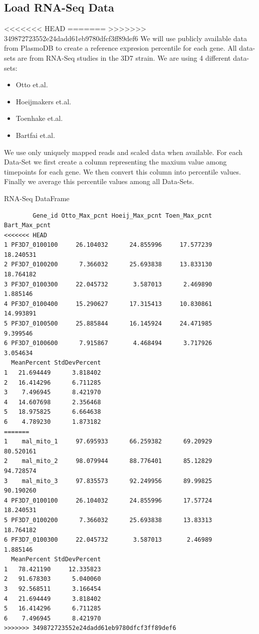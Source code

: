 \documentclass[11pt]{article}
\begin{document}
\subsection{Load RNA-Seq Data}
<<<<<<< HEAD
\label{sec:org3bb7944}
=======
\label{sec:orge943a5f}
>>>>>>> 349872723552e24dadd61eb9780dfcf3ff89def6
We will use publicly available data from PlasmoDB to create a reference expresion percentile for each gene.
All data-sets are from RNA-Seq studies in the 3D7 strain.
We are using 4 different data-sets:
\begin{itemize}
\item Otto et.al.
\item Hoeijmakers et.al.
\item Toenhake et.al.
\item Bartfai et.al.
\end{itemize}

We use only uniquely mapped reads and scaled data when available.
For each Data-Set we first create a column representing the maxium value among timepoints for each gene. We then convert this column into percentile values. Finally we average this percentile values among all Data-Sets.


RNA-Seq DataFrame
\begin{verbatim}
        Gene_id Otto_Max_pcnt Hoeij_Max_pcnt Toen_Max_pcnt Bart_Max_pcnt
<<<<<<< HEAD
1 PF3D7_0100100     26.104032      24.855996     17.577239     18.240531
2 PF3D7_0100200      7.366032      25.693838     13.833130     18.764182
3 PF3D7_0100300     22.045732       3.587013      2.469890      1.885146
4 PF3D7_0100400     15.290627      17.315413     10.830861     14.993891
5 PF3D7_0100500     25.885844      16.145924     24.471985      9.399546
6 PF3D7_0100600      7.915867       4.468494      3.717926      3.054634
  MeanPercent StdDevPercent
1   21.694449      3.818402
2   16.414296      6.711285
3    7.496945      8.421970
4   14.607698      2.356468
5   18.975825      6.664638
6    4.789230      1.873182
=======
1    mal_mito_1     97.695933      66.259382      69.20929     80.520161
2    mal_mito_2     98.079944      88.776401      85.12829     94.728574
3    mal_mito_3     97.835573      92.249956      89.99825     90.190260
4 PF3D7_0100100     26.104032      24.855996      17.57724     18.240531
5 PF3D7_0100200      7.366032      25.693838      13.83313     18.764182
6 PF3D7_0100300     22.045732       3.587013       2.46989      1.885146
  MeanPercent StdDevPercent
1   78.421190     12.335823
2   91.678303      5.040060
3   92.568511      3.166454
4   21.694449      3.818402
5   16.414296      6.711285
6    7.496945      8.421970
>>>>>>> 349872723552e24dadd61eb9780dfcf3ff89def6
\end{verbatim}
\end{document}
